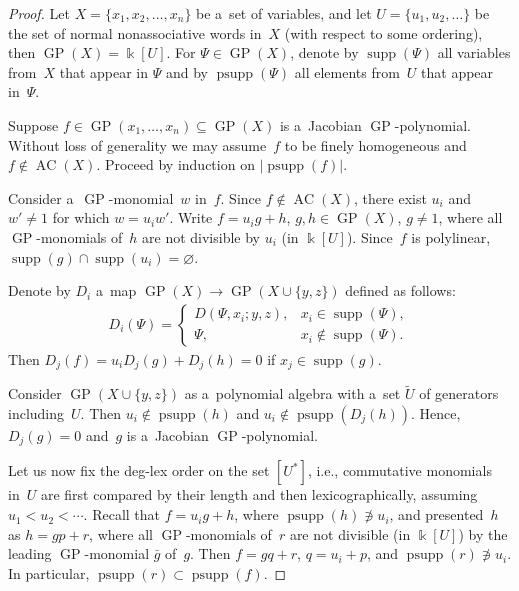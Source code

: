 \documentclass[11pt]{article}
\DeclareMathOperator{\psupp}{psupp}
\DeclareMathOperator{\supp}{supp}
\begin{document}
\begin{proof}
Let $X=\{x_1,x_2,\dots, x_n \}$ be a~set of variables, and let $U=\{u_1,u_2,\dots \}$ be the set of normal
nonassociative words in~$X$ (with respect to some ordering), then $\operatorname{GP}(X) = \Bbbk[U]$.
For $\Psi \in \operatorname{GP}(X)$, denote by $\supp(\Psi)$ all variables from~$X$ that appear in $\Psi $ and by
$\psupp(\Psi)$ all elements from~$U$ that appear in~$\Psi $.

Suppose $f\in \operatorname{GP}(x_1,\dots, x_n)\subseteq \operatorname{GP}(X)$ is a~Jacobian $\operatorname{GP}$-polynomial.
Without loss of generality we may assume~$f$ to be f\/inely homogeneous and $f\notin \operatorname{AC}(X)$.
Proceed by induction on $|\psupp(f)|$.

Consider a~$\operatorname{GP}$-monomial~$w$ in~$f$.
Since $f\not\in \operatorname{AC}(X)$, there exist $u_i$ and $w'\neq 1$ for which $w = u_iw'$.
Write $f = u_ig + h$, $g,h\in \operatorname{GP}(X)$, $g\ne 1$, where all $\operatorname{GP}$-monomials of~$h$ are not divisible by $u_i$ (in $\Bbbk[U]$).
Since~$f$ is polylinear, $\supp(g) \cap \supp(u_i) = \varnothing$.

Denote by $D_i$ a~map $ \operatorname{GP}(X) \to \operatorname{GP}(X\cup \{y,z\})$ def\/ined as follows:
\begin{gather*}
D_i(\Psi) =
\begin{cases}
D(\Psi, x_i; y,z), & x_i\in \supp (\Psi),
\\
\Psi, & x_i\notin \supp (\Psi).
\end{cases}
\end{gather*}
Then $D_j(f) = u_iD_j(g) + D_j(h) = 0$ if $x_j \in \supp(g)$.

Consider $\operatorname{GP}(X\cup \{y,z\})$ as a~polynomial algebra with a~set $\widetilde U$ of generators including~$U$.
Then $u_i\notin \psupp(h)$ and $u_i\notin \psupp(D_j(h))$.
Hence, $D_j(g) = 0$ and~$g$ is a~Jacobian $\operatorname{GP}$-polynomial.

Let us now f\/ix the deg-lex order on the set $[U^*]$, i.e., commutative monomials in~$U$ are f\/irst compared by their
length and then lexicographically, assuming $u_1<u_2<\cdots $.
Recall that $f=u_ig+h$, where $\psupp(h)\not\ni u_i$, and presented~$h$ as $h=gp +r$, where all $\operatorname{GP}$-monomials
of~$r$ are not divisible (in $\Bbbk[U]$) by the leading $\operatorname{GP}$-monomial $\bar g$ of~$g$.
Then $f = gq + r$, $q = u_i + p$, and $\psupp(r)\not\ni u_i$.
In particular, $\psupp(r)\subset \psupp (f)$.


\end{proof}
\end{document}
